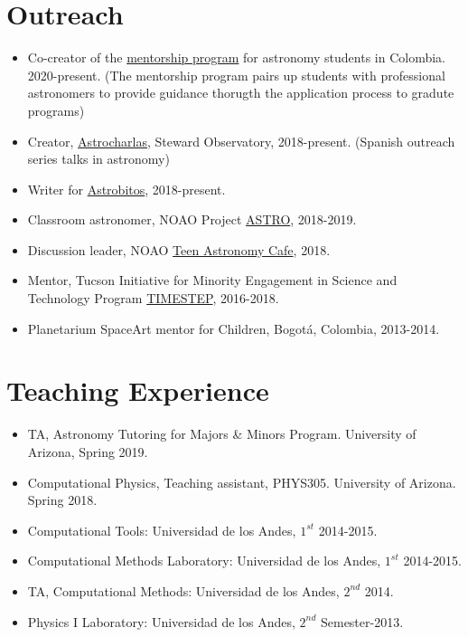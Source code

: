 \documentclass[UTF8]{article}
\begin{document}
\section*{Outreach}

\begin{itemize}
  \setlength\itemsep{0.0em}
  \renewcommand\labelitemi{$\cdot$}
\item Co-creator of the \href{https://recastronomia.github.io/mentores/}{mentorship program} for astronomy students in Colombia. 2020-present.
  (The mentorship program pairs up students with professional astronomers to
  provide guidance thorugth the application process to gradute programs)
\item Creator, \href{https://astrocharlas.github.io/}{Astrocharlas},
Steward Observatory, 2018-present.
 (Spanish outreach series talks in astronomy)
\item Writer for \href{https://astrobitos.org/}{Astrobitos}, 2018-present.
\item Classroom astronomer, NOAO Project \href{https://www.noao.edu/education/astro/}{ASTRO}, 2018-2019.
\item Discussion leader, NOAO \href{http://www.teenastronomycafe.org/}{Teen Astronomy Cafe}, 2018.
\item Mentor, Tucson Initiative for Minority Engagement in Science and Technology Program \href{https://lavinia.as.arizona.edu/~timestep/}{TIMESTEP}, 2016-2018.
\item Planetarium SpaceArt mentor for Children, Bogot\'a, Colombia, 2013-2014.
\end{itemize}



\section*{Teaching Experience}
\begin{itemize}
  \setlength\itemsep{0.0em}
  \renewcommand\labelitemi{$\cdot$}
\item TA, Astronomy Tutoring for
Majors \& Minors Program. University of Arizona, Spring 2019. 
\item Computational Physics, Teaching assistant, PHYS305. University of Arizona. Spring 2018.
\item Computational Tools: Universidad de los Andes, $1^{st}$ 2014-2015.
\item Computational Methods Laboratory: Universidad de los Andes, $1^{st}$ 2014-2015.
\item TA, Computational Methods: Universidad de los Andes, $2^{nd}$ 2014.
\item Physics I Laboratory: Universidad de los Andes, $2^{nd}$ Semester-2013.
\end{itemize}
\end{document}
